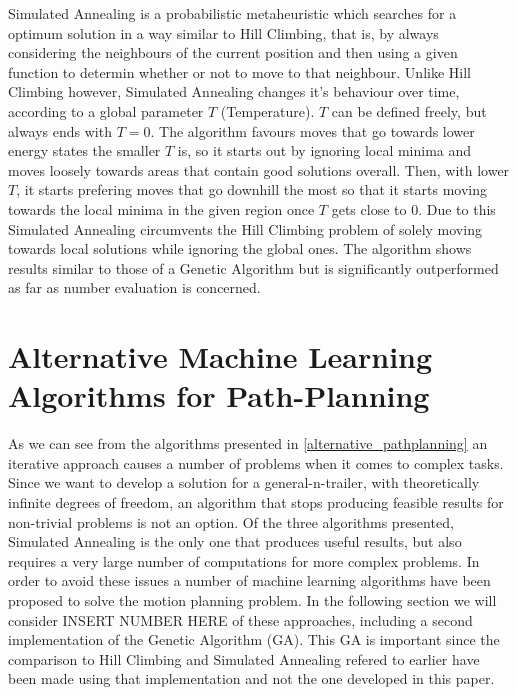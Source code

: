 Simulated Annealing is a probabilistic metaheuristic which searches for a optimum solution in a way similar to Hill Climbing, that is, by always considering the neighbours of the current position and then using a given function to determin whether or not to move to that neighbour. Unlike Hill Climbing however, Simulated Annealing changes it's behaviour over time, according to a global parameter $T$ (Temperature). $T$ can be defined freely, but always ends with $T=0$. The algorithm favours moves that go towards lower energy states the smaller $T$ is, so it starts out by ignoring local minima and moves loosely towards areas that contain good solutions overall. Then, with lower $T$, it starts prefering moves that go downhill the most so that it starts moving towards the local minima in the given region once $T$ gets close to $0$. Due to this Simulated Annealing circumvents the Hill Climbing problem of solely moving towards local solutions while ignoring the global ones. The algorithm shows results similar to those of a Genetic Algorithm but is significantly outperformed as far as number evaluation is concerned.\cite{8}


\section{Alternative Machine Learning Algorithms for Path-Planning}
\label{sec:alternative_machine_learning_pathplanning}

As we can see from the algorithms presented in \ref{alternative_pathplanning} an iterative approach causes a number of problems when it comes to complex tasks. Since we want to develop a solution for a general-n-trailer, with theoretically infinite degrees of freedom, an algorithm that stops producing feasible results for non-trivial problems is not an option. Of the three algorithms presented, Simulated Annealing is the only one that produces useful results, but also requires a very large number of computations \cite{8} for more complex problems. In order to avoid these issues a number of machine learning algorithms have been proposed to solve the motion planning problem. In the following section we will consider INSERT NUMBER HERE of these approaches, including a second implementation of the Genetic Algorithm (GA). This  GA is important since the comparison to Hill Climbing and Simulated Annealing refered to earlier have been made using that implementation and not the one developed in this paper. \cite{8}

